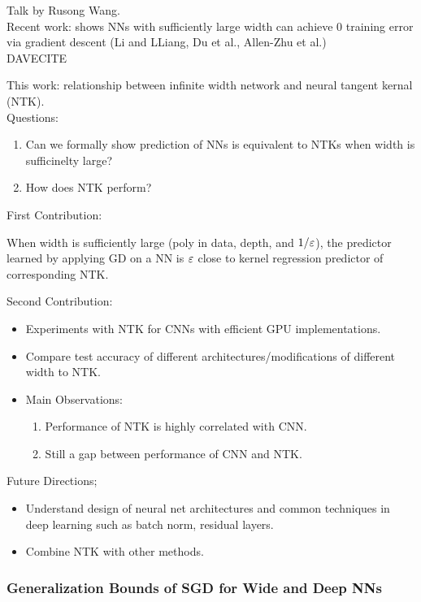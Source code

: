 Talk by Rusong Wang. \\

Recent work: shows NNs with sufficiently large width can achieve 0 training error via gradient descent (Li and LLiang, Du et al., Allen-Zhu et al.) \\DAVECITE

This work: relationship between infinite width network and neural tangent kernal (NTK). \\

Questions:
\begin{enumerate}
    \item Can we formally show prediction of NNs is equivalent to NTKs when width is sufficinelty large?
    \item How does NTK perform?
\end{enumerate}

First Contribution:
\begin{theorem}
When width is sufficiently large (poly in data, depth, and $1/\varepsilon$), the predictor learned by applying GD on a NN is $\varepsilon$ close to kernel regression predictor of corresponding NTK.
\end{theorem}

Second Contribution:
\begin{itemize}
    \item Experiments with NTK for CNNs with efficient GPU implementations.
    \item Compare test accuracy of different architectures/modifications of different width to NTK.
    \item Main Observations:
    \begin{enumerate}
        \item Performance of NTK is highly correlated with CNN.
        \item Still a gap between performance of CNN and NTK.
    \end{enumerate}
\end{itemize}

Future Directions;
\begin{itemize}
    \item Understand design of neural net architectures and common techniques in deep learning such as batch norm, residual layers.
    \item Combine NTK with other methods.
\end{itemize}

\spacerule
\subsubsection{Generalization Bounds of SGD for Wide and Deep NNs \cite{cao2019generalization}}

